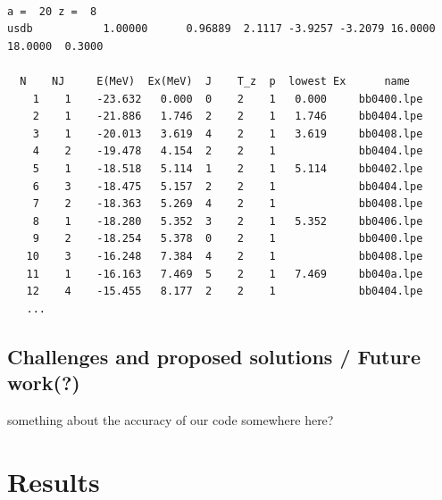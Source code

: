 \documentclass[twoside]{article}
\begin{document}
\begin{lstlisting}[label=nushellx, caption= \texttt{o\_20b.lpt} output from NushellX.]

a =  20 z =  8
usdb           1.00000      0.96889  2.1117 -3.9257 -3.2079 16.0000 18.0000  0.3000

  N    NJ     E(MeV)  Ex(MeV)  J    T_z  p  lowest Ex      name
    1    1    -23.632   0.000  0    2    1   0.000     bb0400.lpe          
    2    1    -21.886   1.746  2    2    1   1.746     bb0404.lpe          
    3    1    -20.013   3.619  4    2    1   3.619     bb0408.lpe          
    4    2    -19.478   4.154  2    2    1             bb0404.lpe          
    5    1    -18.518   5.114  1    2    1   5.114     bb0402.lpe          
    6    3    -18.475   5.157  2    2    1             bb0404.lpe          
    7    2    -18.363   5.269  4    2    1             bb0408.lpe          
    8    1    -18.280   5.352  3    2    1   5.352     bb0406.lpe          
    9    2    -18.254   5.378  0    2    1             bb0400.lpe          
   10    3    -16.248   7.384  4    2    1             bb0408.lpe          
   11    1    -16.163   7.469  5    2    1   7.469     bb040a.lpe          
   12    4    -15.455   8.177  2    2    1             bb0404.lpe
   ...
\end{lstlisting}

\subsection{Challenges and proposed solutions / Future work(?)}

 something about the accuracy of our code somewhere here?




\section{Results}

\end{document}
